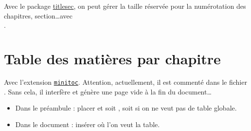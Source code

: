 Avec le package \href{http://mirrors.ctan.org/macros/latex/contrib/titlesec/titlesec.pdf}{titlesec}, on peut gérer la taille réservée pour la numérotation des chapitres, section\dots avec \\
.





\section{Table des matières par chapitre}

Avec l'extension \href{http://mirror.ctan.org/macros/latex/contrib/minitoc/minitoc-fr.pdf}{\texttt{minitoc}}. Attention, actuellement, il est commenté dans le fichier . Sans cela, il interfère et génère une page vide à la fin du document\dots

\begin{itemize}
	\item Dans le préambule : placer \texttt{\dominitoc[n]} et soit \texttt{\tableofcontents}, soit \texttt{\faketableofcontents} si on ne veut pas de table globale.
	\item Dans le document : insérer \texttt{\minitoc} où l'on veut la table.
\end{itemize}

